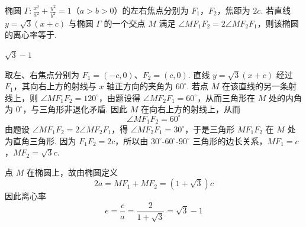 \begin{problem}
椭圆 \(\Gamma: \frac{x^2}{a^2} + \frac{y^2}{b^2} = 1\)（\(a > b > 0\)）的左右焦点分别为 \(F_1\)，\(F_2\)，焦距为 \(2c\). 若直线 \(y = \sqrt{3}(x + c)\) 与椭圆 \(\Gamma\) 的一个交点 \(M\) 满足 \(\angle MF_1F_2 = 2\angle MF_2F_1\)，则该椭圆的离心率等于\fillinblank{}.

\begin{answer}
\(\sqrt{3}-1\)
\end{answer}

\begin{solution}
取左、右焦点分别为 \(F_1=(-c,0)\)、\(F_2=(c,0)\). 直线 \(y=\sqrt3(x+c)\) 经过 \(F_1\)，其向右上方的射线与 \(x\) 轴正方向的夹角为 \(60^\circ\). 若点 \(M\) 在该直线的另一条射线上，则 \(\angle MF_1F_2=120^\circ\)，由题设得 \(\angle MF_2F_1=60^\circ\)，从而三角形在 \(M\) 处的内角为 \(0^\circ\)，与三角形非退化矛盾. 因此 \(M\) 在向右上方的射线上，从而
\[
\angle MF_1F_2=60^\circ
\]
由题设 \(\angle MF_1F_2=2\angle MF_2F_1\)，得 \(\angle MF_2F_1=30^\circ\)，于是三角形 \(MF_1F_2\) 在 \(M\) 处为直角三角形. 因为 \(F_1F_2=2c\)，所以由 \(30^\circ\)-\(60^\circ\)-\(90^\circ\) 三角形的边长关系，\(MF_1=c\)，\(MF_2=\sqrt3c\).

点 \(M\) 在椭圆上，故由椭圆定义
\[
2a=MF_1+MF_2=(1+\sqrt3)c
\]
因此离心率
\[
e=\frac ca=\frac{2}{1+\sqrt3}=\sqrt3-1
\]
\end{solution}
\end{problem}

